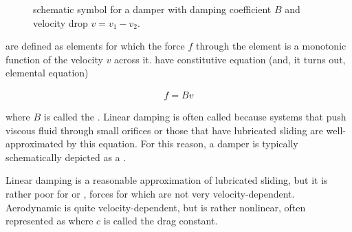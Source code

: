 \documentclass[dynamic_systems.tex]{subfiles}
\begin{document}

\begin{wrapfigure}[10]{r}{0.3\textwidth}
  \centering
  \caption{\label{fig:damper} schematic symbol for a damper with damping coefficient $B$ and velocity drop $v = v_1 - v_2$.}%
\end{wrapfigure}

 are defined as elements for which the force $f$ through the element is a monotonic function of the velocity $v$ across it.
 have constitutive equation (and, it turns out, elemental equation)

\begin{align}
	f = B v
\end{align}

where $B$ is called the .
Linear damping is often called  because systems that push viscous fluid through small orifices or those that have lubricated sliding are well-approximated by this equation.
For this reason, a damper is typically schematically depicted as a .
\tags{}

Linear damping is a reasonable approximation of lubricated sliding, but it is rather poor for  or , forces for which are not very velocity-dependent.
Aerodynamic  is quite velocity-dependent, but is rather nonlinear, often represented as
\noindent where $c$ is called the drag constant.
\end{document}
